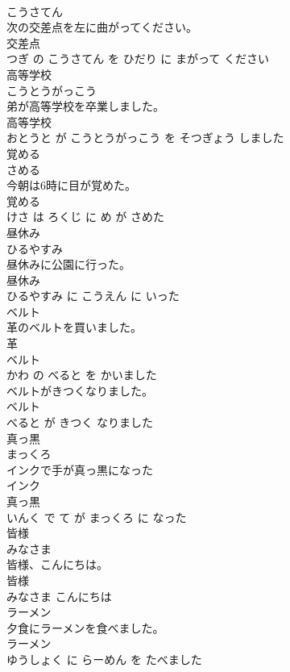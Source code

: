\documentclass[8pt]{extreport}
\begin{document}
\begin{CJK}{UTF8}{min}
\\	こうさてん			
\\	次の交差点を左に曲がってください。	
\\	交差点 
\\	つぎ の こうさてん を ひだり に まがって ください			
\\	高等学校	
\\	こうとうがっこう			
\\	弟が高等学校を卒業しました。	
\\	高等学校 
\\	おとうと が こうとうがっこう を そつぎょう しました			
\\	覚める	
\\	さめる			
\\	今朝は6時に目が覚めた。	
\\	覚める 
\\	けさ は ろくじ に め が さめた			
\\	昼休み	
\\	ひるやすみ			
\\	昼休みに公園に行った。	
\\	昼休み 
\\	ひるやすみ に こうえん に いった			
\\	ベルト	
\\	革のベルトを買いました。	
\\	革 
\\	ベルト 
\\	かわ の べると を かいました			
\\	ベルトがきつくなりました。	
\\	ベルト 
\\	べると が きつく なりました			
\\	真っ黒	
\\	まっくろ			
\\	インクで手が真っ黒になった	
\\	インク 
\\	真っ黒 
\\	いんく で て が まっくろ に なった			
\\	皆様	
\\	みなさま			
\\	皆様、こんにちは。	
\\	皆様 
\\	みなさま こんにちは			
\\	ラーメン	
\\	夕食にラーメンを食べました。	
\\	ラーメン 
\\	ゆうしょく に らーめん を たべました			

\end{CJK}
\end{document}
